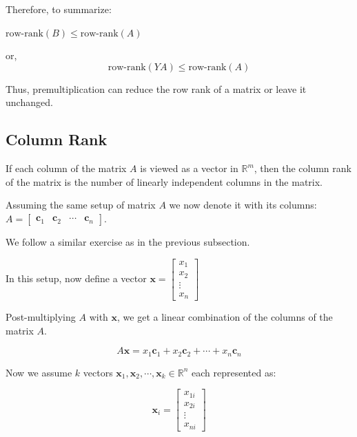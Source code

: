\documentclass[a4paper]{article}
\begin{document}
Therefore, to summarize:

$\text{row-rank}(B) \leq \text{row-rank}(A)$

or, \begin{equation}
\text{row-rank}(YA) \leq \text{row-rank}(A)
\end{equation}

Thus, premultiplication can reduce the row rank of a matrix or leave it unchanged.

\subsection*{Column Rank}

If each column of the matrix $A$ is viewed as a vector in $\mathbb{R}^m$, then the column rank of the matrix is the number of linearly independent columns in the matrix.

Assuming the same setup of matrix $A$ we now denote it with its columns: $A = \begin{bmatrix}
\boldsymbol{c}_1 & \boldsymbol{c}_2 & \cdots & \boldsymbol{c}_n 
\end{bmatrix}$.

We follow a similar exercise as in the previous subsection.

In this setup, now define a vector $\boldsymbol{x}= \begin{bmatrix}
x_1 \\
x_2 \\
\vdots \\
x_n
\end{bmatrix}$

Post-multiplying $A$ with $\boldsymbol{x}$, we get a linear combination of the columns of the matrix $A$.

\begin{equation}
A \boldsymbol{x} = x_1\boldsymbol{c}_1 + x_2\boldsymbol{c}_2 + \cdots + x_n\boldsymbol{c}_n 
\end{equation}

Now we assume $k$ vectors $\boldsymbol{x}_1, \boldsymbol{x}_2, \cdots, \boldsymbol{x}_k \in \mathbb{R}^n$ each represented as:

\begin{equation}
\boldsymbol{x}_i = \begin{bmatrix}
x_{1i}\\
x_{2i}\\
\vdots \\
x_{ni}
\end{bmatrix}
\end{equation}
\end{document}
